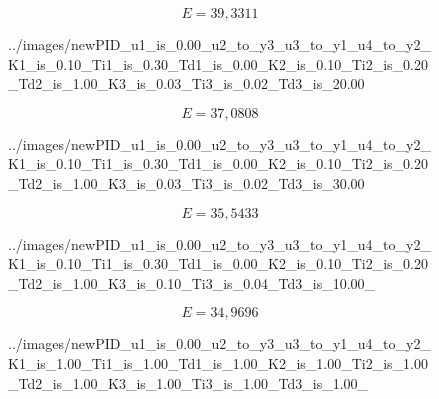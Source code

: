 \begin{equation}
    E = 39,3311
\end{equation}


\begin{figure}[H]
    \centering
    
    \caption{../images/newPID_u1_is_0.00_u2_to_y3_u3_to_y1_u4_to_y2_K1_is_0.10_Ti1_is_0.30_Td1_is_0.00_K2_is_0.10_Ti2_is_0.20_Td2_is_1.00_K3_is_0.03_Ti3_is_0.02_Td3_is_20.00}
\end{figure}

\begin{equation}
    E = 37,0808
\end{equation}


\begin{figure}[H]
    \centering
    
    \caption{../images/newPID_u1_is_0.00_u2_to_y3_u3_to_y1_u4_to_y2_K1_is_0.10_Ti1_is_0.30_Td1_is_0.00_K2_is_0.10_Ti2_is_0.20_Td2_is_1.00_K3_is_0.03_Ti3_is_0.02_Td3_is_30.00}
\end{figure}

\begin{equation}
    E = 35,5433
\end{equation}


\begin{figure}[H]
    \centering
    
    \caption{../images/newPID_u1_is_0.00_u2_to_y3_u3_to_y1_u4_to_y2_K1_is_0.10_Ti1_is_0.30_Td1_is_0.00_K2_is_0.10_Ti2_is_0.20_Td2_is_1.00_K3_is_0.10_Ti3_is_0.04_Td3_is_10.00_}
\end{figure}

\begin{equation}
    E = 34,9696
\end{equation}


\begin{figure}[H]
    \centering
    
    \caption{../images/newPID_u1_is_0.00_u2_to_y3_u3_to_y1_u4_to_y2_K1_is_1.00_Ti1_is_1.00_Td1_is_1.00_K2_is_1.00_Ti2_is_1.00_Td2_is_1.00_K3_is_1.00_Ti3_is_1.00_Td3_is_1.00_}
\end{figure}

